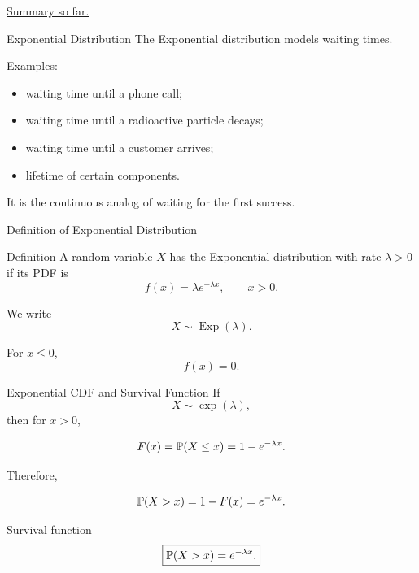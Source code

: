 
\href{https://drive.google.com/file/d/1Qev6nT1mknMwBNL8iIOvS4Ev9mG2eKhW/view?usp=sharing}{Summary so far.}


\begin{frame}{Exponential Distribution}
The Exponential distribution models waiting times.

\vspace{0.25cm}

Examples:
\begin{itemize}
    \item waiting time until a phone call;
    \item waiting time until a radioactive particle decays;
    \item waiting time until a customer arrives;
    \item lifetime of certain components.
\end{itemize}

\vspace{0.25cm}

It is the continuous analog of waiting for the first success.
\end{frame}

\begin{frame}{Definition of Exponential Distribution}
\begin{keybox}{Definition}
A random variable $X$ has the Exponential distribution with rate $\lambda>0$ if its PDF is
\[
f(x)=
\lambda e^{-\lambda x},
\qquad x>0.
\]

We write
\[
X\sim \operatorname{Exp}(\lambda).
\]
\end{keybox}

For $x\leq0$,
\[
f(x)=0.
\]
\end{frame}

\begin{frame}{Exponential CDF and Survival Function}
If
\[
X\sim \operatorname{exp}(\lambda),
\]
then for $x>0$,

\[
F(x)=\mathbb{P}(X\leq x)=1-e^{-\lambda x}.
\]

Therefore,

\[
\mathbb{P}(X>x)=1-F(x)=e^{-\lambda x}.
\]

\vspace{0.25cm}

\begin{keybox}{Survival function}
\[
\boxed{
\mathbb{P}(X>x)=e^{-\lambda x}.
}
\]
\end{keybox}
\end{frame}











